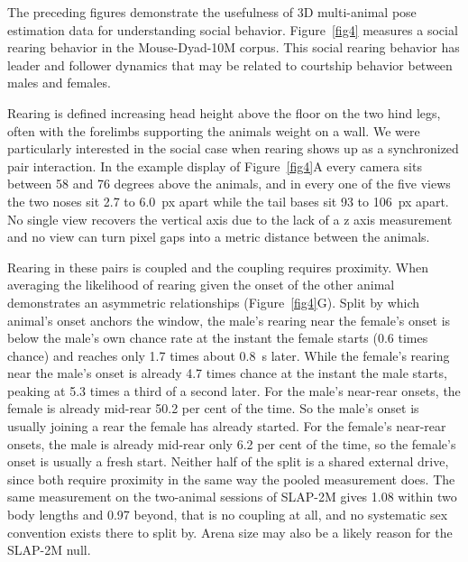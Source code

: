 \documentclass[pdflatex, sn-nature]{sn-jnl}
\theoremstyle{thmstyleone}%
\theoremstyle{thmstyletwo}%
\theoremstyle{thmstylethree}%
\begin{document}
The preceding figures demonstrate the usefulness of 3D multi-animal pose estimation data for understanding social behavior. Figure~\ref{fig4} measures a social rearing behavior in the Mouse-Dyad-10M corpus. This social rearing behavior has leader and follower dynamics that may be related to courtship behavior between males and females. 

Rearing is defined increasing head height above the floor on the two hind legs, often with the forelimbs supporting the animals weight on a wall. We were particularly interested in the social case when rearing shows up as a synchronized pair interaction. In the example display of Figure~\ref{fig4}A every camera sits between 58 and 76 degrees above the animals, and in every one of the five views the two noses sit 2.7 to 6.0~px apart while the tail bases sit 93 to 106~px apart. No single view recovers the vertical axis due to the lack of a z axis measurement and no view can turn pixel gaps into a metric distance between the animals.

Rearing in these pairs is coupled and the coupling requires proximity. When averaging the likelihood of rearing given the onset of the other animal demonstrates an asymmetric relationships (Figure~\ref{fig4}G). Split by which animal's onset anchors the window, the male's rearing near the female's onset is below the male's own chance rate at the instant the female starts (0.6 times chance) and reaches only 1.7 times about 0.8~s later. While the female's rearing near the male's onset is already 4.7 times chance at the instant the male starts, peaking at 5.3 times a third of a second later. For the male's near-rear onsets, the female is already mid-rear 50.2 per cent of the time. So the male's onset is usually joining a rear the female has already started. For the female's near-rear onsets, the male is already mid-rear only 6.2 per cent of the time, so the female's onset is usually a fresh start. Neither half of the split is a shared external drive, since both require proximity in the same way the pooled measurement does. The same measurement on the two-animal sessions of SLAP-2M gives 1.08 within two body lengths and 0.97 beyond, that is no coupling at all, and no systematic sex convention exists there to split by. Arena size may also be a likely reason for the SLAP-2M null.
\end{document}
